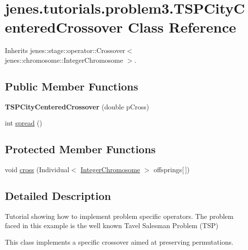 \hypertarget{classjenes_1_1tutorials_1_1problem3_1_1_t_s_p_city_centered_crossover}{
\section{jenes.tutorials.problem3.TSPCityCenteredCrossover Class Reference}
\label{classjenes_1_1tutorials_1_1problem3_1_1_t_s_p_city_centered_crossover}
}
Inherits jenes::stage::operator::Crossover$<$ jenes::chromosome::IntegerChromosome $>$.

\subsection*{Public Member Functions}
\begin{CompactItemize}
\item 
\hypertarget{classjenes_1_1tutorials_1_1problem3_1_1_t_s_p_city_centered_crossover_1609c37822bff6e6af8cb82082d8cd9d}{
\textbf{TSPCityCenteredCrossover} (double pCross)}
\label{classjenes_1_1tutorials_1_1problem3_1_1_t_s_p_city_centered_crossover_1609c37822bff6e6af8cb82082d8cd9d}

\item 
int \hyperlink{classjenes_1_1tutorials_1_1problem3_1_1_t_s_p_city_centered_crossover_3a5e0f99396f1fb6dc89981969d58c13}{spread} ()
\end{CompactItemize}
\subsection*{Protected Member Functions}
\begin{CompactItemize}
\item 
void \hyperlink{classjenes_1_1tutorials_1_1problem3_1_1_t_s_p_city_centered_crossover_eb7cb2d42aeeea2cb008f98d63b64805}{cross} (Individual$<$ \hyperlink{classjenes_1_1chromosome_1_1_integer_chromosome}{IntegerChromosome} $>$ offsprings\mbox{[}$\,$\mbox{]})
\end{CompactItemize}


\subsection{Detailed Description}
Tutorial showing how to implement problem specific operators. The problem faced in this example is the well known Tavel Salesman Problem (TSP)

This class implements a specific crossover aimed at preserving permutations.

